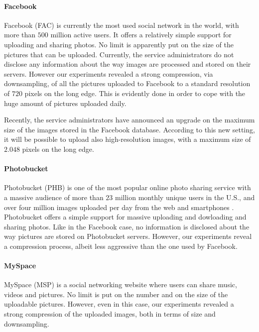 \paragraph{Facebook} Facebook (FAC) is currently the most used social network in the world, with more than $500$ million active users. It offers a relatively simple support for uploading and sharing photos. No limit is apparently put on the size of the pictures that can be uploaded. Currently, the service administrators do not disclose any information about the way images are processed and stored on their servers. However our experiments revealed a strong compression, via downsampling, of all the pictures uploaded to Facebook to a standard resolution of $720$ pixels on the long edge. This is evidently done in order to cope with the huge amount of pictures uploaded daily. 

Recently, the service administrators have announced an upgrade on the maximum size of the images stored in the Facebook database. According to this new setting, it will be possible to upload also high-resolution images, with a maximum size of $2.048$ pixels on the long edge. 

\paragraph{Photobucket} Photobucket (PHB) is one of the most popular online photo sharing service with a massive audience of more than $23$ million monthly unique users in the U.S., and over four million images uploaded per day from the web and smartphones \cite{PhotoBucketStat}. Photobucket offers a simple support for massive uploading and dowloading and sharing photos. Like in the Facebook case, no information is disclosed about the way pictures are stored on Photobucket servers. However, our experiments reveal a compression process, albeit less aggressive than the one used by Facebook. 



\paragraph{MySpace} MySpace (MSP) is a social networking website where users can share music, videos and pictures. No limit is put on the number and on the size of the uploadable pictures. However, even in this case, our experiments revealed a strong compression of the uploaded images, both in terms of size and downsampling. 

